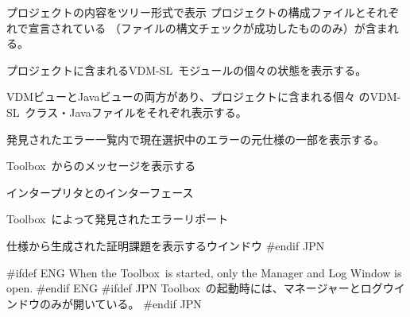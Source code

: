 \documentclass[\pformat,12pt]{article}
\newcommand{\vdmslpp}{VDM-SL}
\newcommand{\Toolbox}{Toolbox}
\newcommand{\vdmslpp}{VDM++}
\newcommand{\Toolbox}{Toolbox}
\newcommand{\guicmd}[1]{{\sf #1}}
\newcommand{\guicmd}[1]{{\gt #1}}
\begin{document}
\begin{description}
  \begin{description}
  \item[\guicmd{プロジェクトビュー}]
  プロジェクトの内容をツリー形式で表示
  プロジェクトの構成ファイルとそれぞれで宣言されている 
  （ファイルの構文チェックが成功したもののみ）が含まれる。
  
  {
       プロジェクトに含まれる\vdmslpp\ モジュールの個々の状態を表示する。
  }
  {
     \item[\guicmd{クラスビュー}]
       \guicmd{VDMビュー}と\guicmd{Javaビュー}の両方があり、プロジェクトに含まれる個々
       の\vdmslpp\ クラス・Javaファイルをそれぞれ表示する。
  } 
  \end{description}

\item[\guicmd{ソースウインドウ}]
  発見された\guicmd{エラー一覧}内で現在選択中のエラーの元仕様の一部を表示する。

\item[\guicmd{ログウインドウ}]
  \Toolbox\ からのメッセージを表示する
\item[\guicmd{実行ウインドウ}]
インタープリタとのインターフェース

\item[\guicmd{エラー一覧}]
\Toolbox\ によって発見されたエラーリポート
\item[\guicmd{証明課題ウインドウ}]
  仕様から生成された証明課題を表示するウインドウ
#endif JPN
\end{description}

#ifdef ENG
When the \Toolbox\ is started, only the \guicmd{Manager} and \guicmd{Log Window} is open.
#endif ENG
#ifdef JPN
\Toolbox\ の起動時には、\guicmd{マネージャー}と\guicmd{ログウインドウ}のみが開いている。
#endif JPN
\end{document}
